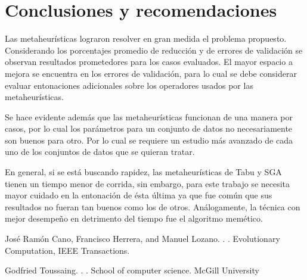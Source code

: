 \documentclass[11pt]{article}
\begin{document}
\section{Conclusiones y recomendaciones}

Las metaheurísticas lograron resolver en gran medida el problema propuesto. Considerando los porcentajes promedio de reducción y de errores de validación se observan resultados prometedores para los casos evaluados. El mayor espacio a mejora se encuentra en los errores de validación, para lo cual se debe considerar evaluar entonaciones adicionales sobre los operadores usados por las metaheurísticas.

Se hace evidente además que las metaheurísticas funcionan de una manera por casos, por lo cual los parámetros para un conjunto de datos no necesariamente son buenos para otro. Por lo cual se requiere un estudio más avanzado de cada uno de los conjuntos de datos que se quieran tratar.

En general, si se está buscando rapidez, las metaheurísticas de Tabu y SGA tienen un tiempo menor de corrida, sin embargo, para este trabajo se necesita mayor cuidado en la entonación de ésta última ya que fue común que sus resultados no fueran tan buenos como los de otros. Análogamente, la técnica con mejor desempeño en detrimento del tiempo fue el algoritmo memético.

%
%

\begin{thebibliography}{}

José Ramón Cano, Francisco Herrera, and Manuel Lozano.
.
.
\newblock Evolutionary Computation, IEEE Transactions.

Godfried Toussaing.
.
.
\newblock School of computer science. McGill University

\end{thebibliography}
\end{document}
